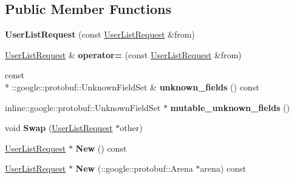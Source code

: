 \subsection*{Public Member Functions}
\begin{DoxyCompactItemize}
\item 
\hypertarget{classSimpleChat_1_1UserListRequest_adf87a872a0904fb5a015a27dc9ed615b}{{\bfseries User\-List\-Request} (const \hyperlink{classSimpleChat_1_1UserListRequest}{User\-List\-Request} \&from)}\label{classSimpleChat_1_1UserListRequest_adf87a872a0904fb5a015a27dc9ed615b}

\item 
\hypertarget{classSimpleChat_1_1UserListRequest_a44923332cb0344abc96ef3adecd31a64}{\hyperlink{classSimpleChat_1_1UserListRequest}{User\-List\-Request} \& {\bfseries operator=} (const \hyperlink{classSimpleChat_1_1UserListRequest}{User\-List\-Request} \&from)}\label{classSimpleChat_1_1UserListRequest_a44923332cb0344abc96ef3adecd31a64}

\item 
\hypertarget{classSimpleChat_1_1UserListRequest_a3e0db8f83f36267008abb4e79b3df138}{const \\*
\-::google\-::protobuf\-::\-Unknown\-Field\-Set \& {\bfseries unknown\-\_\-fields} () const }\label{classSimpleChat_1_1UserListRequest_a3e0db8f83f36267008abb4e79b3df138}

\item 
\hypertarget{classSimpleChat_1_1UserListRequest_aa1fc777d8e850616b3d3ebc023bb5b04}{inline\-::google\-::protobuf\-::\-Unknown\-Field\-Set $\ast$ {\bfseries mutable\-\_\-unknown\-\_\-fields} ()}\label{classSimpleChat_1_1UserListRequest_aa1fc777d8e850616b3d3ebc023bb5b04}

\item 
\hypertarget{classSimpleChat_1_1UserListRequest_ae301e4d1c6d099a73f2b6f9b938234a4}{void {\bfseries Swap} (\hyperlink{classSimpleChat_1_1UserListRequest}{User\-List\-Request} $\ast$other)}\label{classSimpleChat_1_1UserListRequest_ae301e4d1c6d099a73f2b6f9b938234a4}

\item 
\hypertarget{classSimpleChat_1_1UserListRequest_a7a1c940050451424a13ced56a5a25528}{\hyperlink{classSimpleChat_1_1UserListRequest}{User\-List\-Request} $\ast$ {\bfseries New} () const }\label{classSimpleChat_1_1UserListRequest_a7a1c940050451424a13ced56a5a25528}

\item 
\hypertarget{classSimpleChat_1_1UserListRequest_a68b46b687074a254fc37acf6049527b1}{\hyperlink{classSimpleChat_1_1UserListRequest}{User\-List\-Request} $\ast$ {\bfseries New} (\-::google\-::protobuf\-::\-Arena $\ast$arena) const }\label{classSimpleChat_1_1UserListRequest_a68b46b687074a254fc37acf6049527b1}


\end{DoxyCompactItemize}
